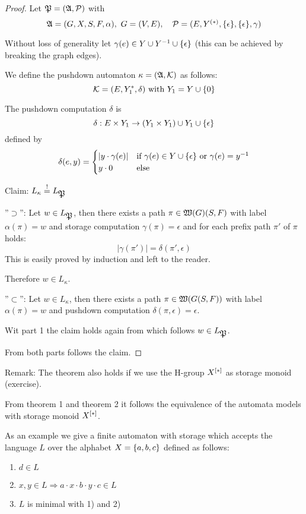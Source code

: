 \begin{proof}
Let $\mbox{$\mathfrak{P}$}=(\mbox{$\mathfrak{A}$}, \mbox{$\mathcal{P}$})$ with
\[ \mbox{$\mathfrak{A}$}=(G, X, S, F, \alpha),\ G=(V,E),\quad \mbox{$\mathcal{P}$}=(E, \mbox{${Y}^{(*)}$},
\mbox{$\{\epsilon\}$}, \mbox{$\{\epsilon\}$}, \gamma) \]

Without loss of generality let $\gamma(e) \in Y \cup Y^{-1} \cup
\mbox{$\{\epsilon\}$}$ (this can be achieved by breaking the graph edges).

We define the pushdown automaton $\kappa = (\mbox{$\mathfrak{A}$}, \mbox{$\mathcal{K}$})$ as follows:
\[ \mbox{$\mathcal{K}$} = (E, Y_1^*, \delta)\text{ with }Y_1 = Y \cup \mbox{$\{0\}$} \]

The pushdown computation $\delta$ is 
\[ \delta: E \times Y_1 \to (Y_1 \times Y_1) \cup Y_1 \cup \mbox{$\{\epsilon\}$} \]
defined by
\[ \delta(e, y) = \begin{cases}
	|y \cdot \gamma(e)| & \text{if }\gamma(e) \in Y \cup \mbox{$\{\epsilon\}$}\text{ or
	} \gamma(e) = y^{-1} \\
	y \cdot 0 & \text{else}
\end{cases} \]

Claim: $L_\kappa \stackrel{!}{=} L_{\mbox{$\mathfrak{P}$}}$

''$\supset$'': Let $w \in L_{\mbox{$\mathfrak{P}$}}$, then there exists a path $\pi \in
\mbox{$\mathfrak{W}(G)$}(S, F)$ with label $\alpha(\pi) = w$ and storage computation
$\gamma(\pi) = \epsilon$ and for each prefix path $\pi'$ of $\pi$ holds:
\[ |\gamma(\pi')| = \delta(\pi', \epsilon) \]
This is easily proved by induction and left to the reader.

Therefore $w \in L_\kappa$.

\bigskip
''$\subset$'': Let $w \in L_\kappa$, then there exists a path $\pi \in
\mbox{$\mathfrak{W}(G(S, F))$}$ with label $\alpha(\pi)=w$ and pushdown computation
$\delta(\pi, \epsilon) = \epsilon$.

Wit part 1 the claim holds again from which follows $w \in L_{\mbox{$\mathfrak{P}$}}$.

From both parts follows the claim.
\end{proof}

\bigskip
Remark: The theorem also holds if we use the H-group $\mbox{${X}^{[*]}$}$ as storage
monoid (exercise).

From theorem 1 and theorem 2 it follows the equivalence of the automata models
with storage monoid $\mbox{${X}^{[*]}$}$.

\bigskip
As an example we give a finite automaton with storage which accepts the language
$L$ over the alphabet $X = \mbox{$\{a, b, c\}$}$ defined as follows:
\begin{enumerate}
  \item $d \in L$
  \item $x, y \in L \Rightarrow a\cdot x\cdot b\cdot y\cdot c\in L$
  \item $L$ is minimal with 1) and 2)
\end{enumerate}


